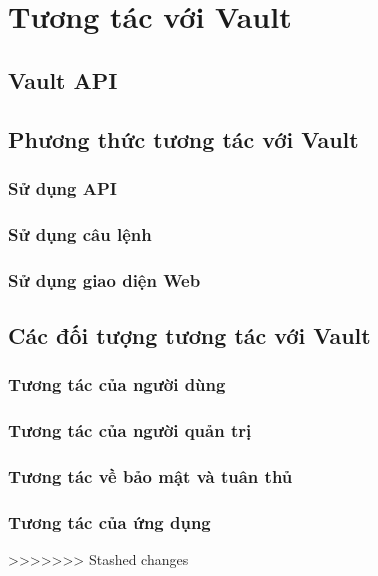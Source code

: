 \documentclass[12pt,a4paper]{report}
\begin{document}
	\section{Tương tác với Vault}
	\subsection{Vault API}
	\subsection{Phương thức tương tác với Vault}
	\subsubsection{Sử dụng API}
	\subsubsection{Sử dụng câu lệnh}
	\subsubsection{Sử dụng giao diện Web}
	\subsection{Các đối tượng tương tác với Vault}
	\subsubsection{Tương tác của người dùng}
	\subsubsection{Tương tác của người quản trị}
	\subsubsection{Tương tác về bảo mật và tuân thủ}
	\subsubsection{Tương tác của ứng dụng}
>>>>>>> Stashed changes
\end{document}
